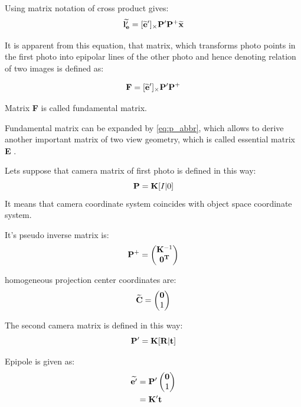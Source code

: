 \documentclass[a4paper,12pt]{article}
\newcommand{\ematr}[1]{
{\bf #1}
}
\newcommand{\evect}[1]{
{\bf #1}
}
\newcommand{\ehvect}[1]{
{\bf \widetilde{#1}}
}
\begin{document}
Using matrix notation of cross product gives:
\begin{equation}
\ehvect{l'_{e}}  = [\ehvect{e}']_{\times} \ematr{P'}\ematr{P}^{+}\ehvect{x}
\end{equation}

It is apparent from this equation, that matrix, which transforms photo points in the first photo into 
epipolar lines of the other photo and hence denoting relation of two images is defined as:

\begin{equation}
\ematr{F}  = [\ehvect{e}']_{\times} \ematr{P'}\ematr{P}^{+}
\end{equation}

Matrix \ematr{F} is called fundamental matrix. 

Fundamental matrix can be expanded by \eqref{eq:p_abbr}, which
allows to derive another important matrix of two view geometry, which is called essential matrix \ematr{E}.

Lets suppose that camera matrix of first photo is defined in this way:
\begin{equation}
\label{eq:rel_or_cam1}
\ematr{P}  = \ematr{K} \ematr{[}I|0\ematr{]}
\end{equation}
It means that camera coordinate system coincides with object space coordinate 
system.

It's pseudo inverse matrix is:
\begin{equation}
\ematr{P}^{+} =
\begin{pmatrix}
   \ematr{K}^{-1} \\
   \evect{0^{T}} \\
\end{pmatrix}
\end{equation}

homogeneous projection center coordinates are:
\begin{equation}
\ehvect{C} =
\begin{pmatrix}
   \evect{0} \\
    1 \\
\end{pmatrix}
\end{equation}

The second camera matrix is defined in this way:
\begin{equation}
\label{eq:rel_or_cam2}
\ematr{P}'  = \ematr{K} \ematr{[}\ematr{R}|\evect{t}\ematr{]}
\end{equation}


Epipole is given as:
\begin{equation}
\begin{split}
\label{eg:second_epipole}
\ehvect{e'} &=  \ematr{P'}
\begin{pmatrix}
   \evect{0} \\
    1 \\
\end{pmatrix} \\
&= \ematr{K}' \evect{t}\\
\end{split}
\end{equation}
\end{document}
